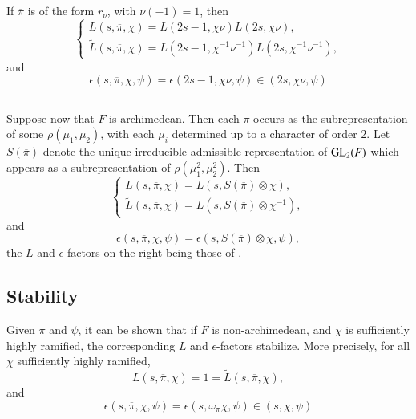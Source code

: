 \subsection{}\label{art1-sec6.4}
If $\overline{\pi}$ is of the form $r_{\nu}$, with $\nu(-1)=1$, then
$$
\begin{cases}
L(s,\overline{\pi},\chi)=L(2s-1,\chi\nu)L(2s,\chi\nu),\\
\widetilde{L}(s,\overline{\pi},\chi)=L(2s-1,\chi^{-1}\nu^{-1})L(2s,\chi^{-1}\nu^{-1}),
\end{cases}
$$
and
$$
\epsilon(s,\overline{\pi},\chi,\psi)=\epsilon(2s-1,\chi\nu,\psi)\in (2s,\chi\nu,\psi)
$$\pageoriginale

\subsection{}\label{art1-sec6.5}
Suppose now that $F$ is archimedean. Then each $\overline{\pi}$ occurs as the subrepresentation of some $\overline{\rho}(\mu_{1},\mu_{2})$, with each $\mu_{i}$ determined up to a character of order $2$. Let $S(\overline{\pi})$ denote the unique irreducible admissible representation of $\mathrm{GL}_{2}(F)$ which appears as a subrepresentation of $\rho(\mu^{2}_{1},\mu^{2}_{2})$. Then
$$
\begin{cases}
L(s,\overline{\pi},\chi)=L(s,S(\overline{\pi})\otimes \chi),\\
\widetilde{L}(s,\overline{\pi},\chi)=L(s,S(\overline{\pi})\otimes \chi^{-1}),
\end{cases}
$$
and
$$
\epsilon(s,\overline{\pi},\chi,\psi)=\epsilon(s,S(\overline{\pi})\otimes \chi, \psi),
$$
the $L$ and $\epsilon$ factors on the right being those of \cite{Jacquet-Langlands}.

\subsection{Stability}\label{art1-sec6.6}

Given $\overline{\pi}$ and $\psi$, it can be shown that if $F$ is non-archi\-medean, and $\chi$ is sufficiently highly ramified, the corresponding $L$ and $\epsilon$-factors stabilize. More precisely, for all $\chi$ sufficiently highly ramified,
$$
L(s,\overline{\pi},\chi)=1=\widetilde{L}(s,\overline{\pi},\chi),
$$
and
\setcounter{equation}{0}
\begin{equation}
\epsilon(s,\overline{\pi},\chi,\psi)=\epsilon(s,\omega_{\pi}\chi,\psi)\in (s,\chi,\psi)\label{art1-eq6.6.1}
\end{equation}

